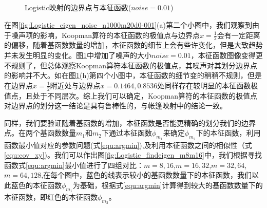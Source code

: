\begin{figure}[!]
    \centering%
      \\
      \\
      \\
      \\
      \caption{Logistic映射的边界点与本征函数($noise=0.01$)}\label{fig:Logistic_eigen_noise_n1000m20d0-01}
\end{figure}

在图\ref{fig:Logistic_eigen_noise_n1000m20d0-001}(a)第二个小图中，我们观察到由于噪声项的影响，Koopman算符的本征函数的极值点与边界点$x=\frac{1}{2}$会有一定距离的偏移，随着基函数数量的增加，本征函数的细节上会有些许变化，但是大致趋势并未发生明显的变化。图\ref{fig:Logistic_eigen_noise_n1000m20d0-01}中增加了噪声的大小$noise=0.01$，本征函数图像变得更不规则了，但总体观察Koopman算符本征函数的极值点，其噪声对其划分边界点的影响并不大。如在图\ref{fig:Logistic_eigen_noise_n1000m20d0-01}(h)第四个小图中，本征函数的细节变的稍稍不规则，但是在边界点$x=\frac{1}{2}$附近处与边界点$x=0.1464,0.8536$处同样存在较明显的本征函数极值点，且处于不同层次。综上我们可以确定，Koopman算符的本征函数的极值点对边界点的划分这一结论是具有鲁棒性的，与帐篷映射中的结论一致。

同样，我们要验证随着基函数的增加，本征函数是否能更精确的划分我们的边界点。在两个基函数数量$m_1$和$m_2$下通过本征函数$\phi_{m_1}$来确定$\phi_{m_2}$下的本征函数，利用函数最小值对应的参数问题(式\ref{equ:argmin}),及利用本征函数之间的相似性（式\ref{equ:cov_xy})。我们可以作出图\ref{fig:Logistic_findeigen_m8m16}中，我们根据寻找函数式\ref{equ:argmin}最小值进行了四组对比：$m=8,16$,$m=16,32$,$m=32,64$,$m=64,128$,在每个图中，蓝色的线表示较小的基函数数量下的本征函数，我们以此蓝色的本征函数$\phi_{m_1}$为基础，根据式\ref{equ:argmin}计算得到较大的基函数数量下的本征函数，即红色的本征函数$\phi_{m_2}$。


